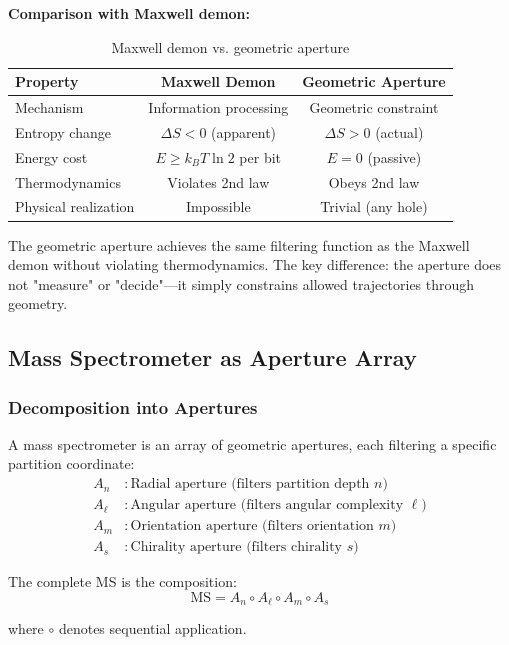 \textbf{Comparison with Maxwell demon:}

\begin{table}[h]
\centering
\caption{Maxwell demon vs. geometric aperture}
\label{tab:demon_vs_aperture}
\begin{tabular}{lcc}
\toprule
\textbf{Property} & \textbf{Maxwell Demon} & \textbf{Geometric Aperture} \\
\midrule
Mechanism & Information processing & Geometric constraint \\
Entropy change & $\Delta S < 0$ (apparent) & $\Delta S > 0$ (actual) \\
Energy cost & $E \geq k_B T \ln 2$ per bit & $E = 0$ (passive) \\
Thermodynamics & Violates 2nd law & Obeys 2nd law \\
Physical realization & Impossible & Trivial (any hole) \\
\bottomrule
\end{tabular}
\end{table}

The geometric aperture achieves the same filtering function as the Maxwell demon without violating thermodynamics. The key difference: the aperture does not "measure" or "decide"—it simply constrains allowed trajectories through geometry.

\subsection{Mass Spectrometer as Aperture Array}

\subsubsection{Decomposition into Apertures}

\begin{theorem}
\label{thm:ms_aperture_array}
A mass spectrometer is an array of geometric apertures, each filtering a specific partition coordinate:
\begin{align}
A_n &: \text{Radial aperture (filters partition depth } n) \\
A_\ell &: \text{Angular aperture (filters angular complexity } \ell) \\
A_m &: \text{Orientation aperture (filters orientation } m) \\
A_s &: \text{Chirality aperture (filters chirality } s)
\end{align}

The complete MS is the composition:
\begin{equation}
\text{MS} = A_n \circ A_\ell \circ A_m \circ A_s
\end{equation}

where $\circ$ denotes sequential application.
\end{theorem}

